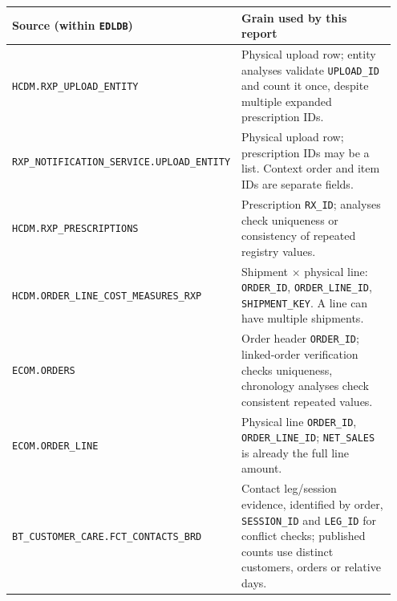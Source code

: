 \begin{longtable}{@{}>{\raggedright\arraybackslash}p{0.36\linewidth}>{\raggedright\arraybackslash}p{0.59\linewidth}@{}}
\toprule
Source (within \texttt{EDLDB}) & Grain used by this report \\
\midrule
\endhead

\texttt{HCDM.RXP\_UPLOAD\_ENTITY} & Physical upload row; entity analyses validate \texttt{UPLOAD\_ID} and count it once, despite multiple expanded prescription IDs. \\

\texttt{RXP\_NOTIFICATION\_SERVICE.}\allowbreak\texttt{UPLOAD\_ENTITY} & Physical upload row; prescription IDs may be a list. Context order and item IDs are separate fields. \\

\texttt{HCDM.RXP\_PRESCRIPTIONS} & Prescription \texttt{RX\_ID}; analyses check uniqueness or consistency of repeated registry values. \\

\texttt{HCDM.ORDER\_LINE\_COST\_}\allowbreak\texttt{MEASURES\_RXP} & Shipment $\times$ physical line: \texttt{ORDER\_ID}, \texttt{ORDER\_LINE\_ID}, \texttt{SHIPMENT\_KEY}. A line can have multiple shipments. \\

\texttt{ECOM.ORDERS} & Order header \texttt{ORDER\_ID}; linked-order verification checks uniqueness, chronology analyses check consistent repeated values. \\

\texttt{ECOM.ORDER\_LINE} & Physical line \texttt{ORDER\_ID}, \texttt{ORDER\_LINE\_ID}; \texttt{NET\_SALES} is already the full line amount. \\

\texttt{BT\_CUSTOMER\_CARE.}\allowbreak\texttt{FCT\_CONTACTS\_BRD} & Contact leg/session evidence, identified by order, \texttt{SESSION\_ID} and \texttt{LEG\_ID} for conflict checks; published counts use distinct customers, orders or relative days. \\
\bottomrule
\end{longtable}